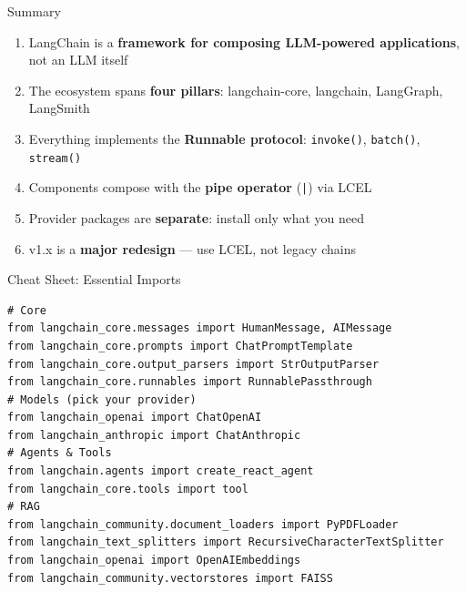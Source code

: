 \documentclass[aspectratio=169,11pt]{beamer}
\begin{document}
\begin{frame}{Summary}

\begin{conceptbox}
\begin{enumerate}\setlength{\itemsep}{1pt}
  \item LangChain is a \textbf{framework for composing LLM-powered applications}, not an LLM itself
  \item The ecosystem spans \textbf{four pillars}: langchain-core, langchain, LangGraph, LangSmith
  \item Everything implements the \textbf{Runnable protocol}: \texttt{invoke()}, \texttt{batch()}, \texttt{stream()}
  \item Components compose with the \textbf{pipe operator} (\texttt{|}) via LCEL
  \item Provider packages are \textbf{separate}: install only what you need
  \item v1.x is a \textbf{major redesign} --- use LCEL, not legacy chains
\end{enumerate}
\end{conceptbox}
\end{frame}

\begin{frame}[fragile]{Cheat Sheet: Essential Imports}

\begin{codebox}
\begin{lstlisting}[basicstyle=\ttfamily\tiny]
# Core
from langchain_core.messages import HumanMessage, AIMessage
from langchain_core.prompts import ChatPromptTemplate
from langchain_core.output_parsers import StrOutputParser
from langchain_core.runnables import RunnablePassthrough
# Models (pick your provider)
from langchain_openai import ChatOpenAI
from langchain_anthropic import ChatAnthropic
# Agents & Tools
from langchain.agents import create_react_agent
from langchain_core.tools import tool
# RAG
from langchain_community.document_loaders import PyPDFLoader
from langchain_text_splitters import RecursiveCharacterTextSplitter
from langchain_openai import OpenAIEmbeddings
from langchain_community.vectorstores import FAISS
\end{lstlisting}
\end{codebox}
\end{frame}
\end{document}
